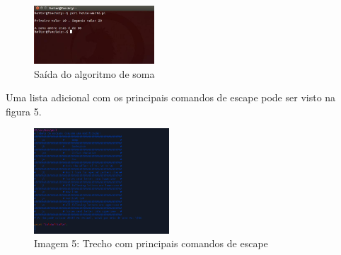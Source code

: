 \begin{figure}[!htb]
	\centering
	\includegraphics[width=0.4\textwidth]{../5_figuras/image4}
	\caption{Sa\'ida do algoritmo de soma}
\end{figure}

Uma lista adicional com os principais comandos de escape pode ser visto na figura 5.

\begin{figure}[!htb]
	\centering
	\includegraphics[width=0.45\textwidth]{../5_figuras/image5}
	\caption{Imagem 5: Trecho com principais comandos de escape}
\end{figure}

